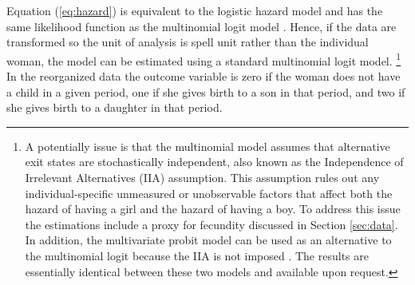 \documentclass[12pt,letterpaper]{article}
\begin{document}
Equation (\ref{eq:hazard}) is equivalent to the logistic hazard model and has the same 
likelihood function as the multinomial logit model \citep{allison82,jenkins95}.
Hence, if the data are transformed so the unit of analysis is spell unit rather 
than the individual woman, the model can be estimated using a standard multinomial logit model.%
\footnote{
A potentially issue is that the multinomial model assumes that alternative 
exit states are stochastically independent,
also known as the Independence of Irrelevant Alternatives (IIA) assumption.
This assumption rules out any individual-specific unmeasured or 
unobservable factors that affect both the hazard of having a girl and the 
hazard of having a boy.
To address this issue the estimations include a proxy for fecundity
discussed in Section \ref{sec:data}.
In addition, the multivariate probit model can be used as an alternative
to the multinomial logit because the IIA is not imposed \citep{han90}.
The results are essentially identical between these two models and
available upon request.
}
In the reorganized data the outcome variable is zero if the
woman does not have a child in a given period, one if she gives birth to a son in that period,
and two if she gives birth to a daughter in that period.
\end{document}

